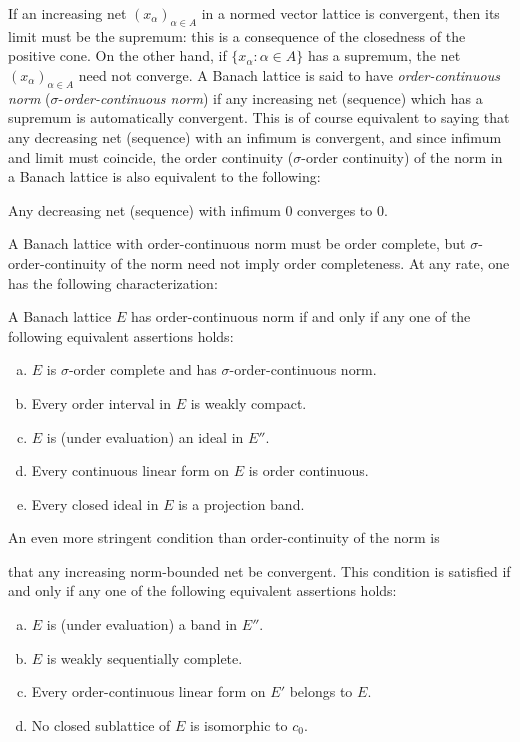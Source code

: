 If an increasing net $ (x_{\alpha})_{\alpha\in A} $ in a normed vector lattice is convergent, then its limit must be the supremum:
this is a consequence of the closedness of the positive cone.
On the other hand, if $ \{x_{\alpha} : \alpha \in A\} $ has a supremum, the net $ (x_{\alpha})_{\alpha\in A} $ need not converge.
A Banach lattice is said to have \emph{order-continuous norm} ($ \sigma $-\emph{order-continuous norm}) if any increasing net (sequence) which has a supremum is automatically convergent.
This is of course equivalent to saying that any decreasing net (sequence) with an infimum is convergent, and since infimum and limit must coincide, the order continuity ($ \sigma $-order continuity) of the norm in a Banach lattice is also equivalent to the following:

Any decreasing net (sequence) with infimum $ 0 $ converges to $ 0 $.

A Banach lattice with order-continuous norm must be order complete, but $ \sigma $-order-continuity of the norm need not imply order completeness.
At any rate, one has the following characterization:

A Banach lattice $ E $ has order-continuous norm if and only if any one of the following equivalent assertions holds:

\begin{enumerate}[(a)]
\item $ E $ is $ \sigma $-order complete and has $ \sigma $-order-continuous norm.
\item Every order interval in $ E $ is weakly compact.
\item $ E $ is (under evaluation) an ideal in $ E'' $.
\item Every continuous linear form on $ E $ is order continuous.
\item Every closed ideal in $ E $ is a projection band.
\end{enumerate}

An even more stringent condition than order-continuity of the norm is



\pagebreak

that any increasing norm-bounded net be convergent.
This condition is satisfied if and only if any one of the following equivalent assertions holds:

\begin{enumerate}[(a)]
\item $ E $ is (under evaluation) a band in $ E'' $.
\item $ E $ is weakly sequentially complete.
\item Every order-continuous linear form on $ E' $ belongs to $ E $.
\item No closed sublattice of $ E $ is isomorphic to $ c_{0} $.
\end{enumerate}


